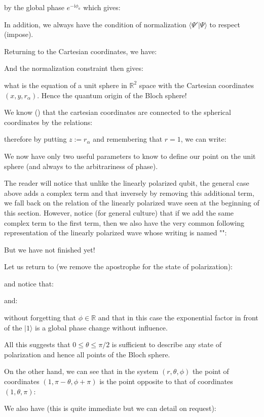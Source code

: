 	by the global phase $e^{-\mathrm{i}\phi_a}$ which gives:
	
	In addition, we always have the condition of normalization $\langle \Psi' | \Psi\rangle$ to respect (impose).
	
	Returning to the Cartesian coordinates, we have:
	
	And the normalization constraint then gives:
	
	what is the equation of a unit sphere in $\mathbb{R}^2$ space with the Cartesian coordinates $(x,y,r_\alpha)$. Hence the quantum origin of the Bloch sphere!
	
	We know () that the cartesian coordinates are connected to the spherical coordinates by the relations:
	
	therefore by putting $z:=r_\alpha$ and remembering that $r=1$, we can write:
	
	We now have only two useful parameters to know to define our point on the unit sphere (and always to the arbitrariness of phase).
	
	The reader will notice that unlike the linearly polarized qubit, the general case above adds a complex term and that inversely by removing this additional term, we fall back on the relation of the linearly polarized wave seen at the beginning of this section. However, notice (for general culture) that if we add the same complex term to the first term, then we also have the very common following representation of the linearly polarized wave whose writing is named "":
	
	But we have not finished yet!

	Let us return to (we remove the apostrophe for the state of polarization):
	
	and notice that:
	
	and:
	
	without forgetting that $\phi\in\mathbb{R}$ and that in this case the exponential factor in front of the $|1\rangle$ is a global phase change without influence.

	All this suggests that $0\le \theta \le \pi/2 $ is sufficient to describe any state of polarization and hence all points of the Bloch sphere.

	On the other hand, we can see that in the system $(r,\theta,\phi)$ the point of coordinates $(1,\pi-\theta,\phi+\pi)$ is the point opposite to that of coordinates $(1,\theta,\pi)$:
	
	We also have (this is quite immediate but we can detail on request):
	
